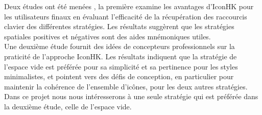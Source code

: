 \documentclass[12pt,a4paper]{article}
\newcommand\tab[1][0.65cm]{\hspace*{#1}}
\begin{document}
\tab Deux études ont été menées \cite{8}, la première examine les avantages d'IconHK pour les utilisateurs finaux en évaluant l'efficacité de la récupération des raccourcis clavier des différentes stratégies. Les résultats suggèrent que les stratégies spatiales positives et négatives sont des aides mnémoniques utiles.\\
\tab Une deuxième étude fournit des idées de concepteurs professionnels sur la praticité de l'approche IconHK. Les résultats indiquent que la stratégie de l'espace vide est préférée pour sa simplicité et sa
pertinence pour les styles minimalistes, et pointent vers des défis de conception, en particulier pour maintenir la cohérence de l'ensemble d'icônes, pour les deux autres stratégies.\\
\tab Dans ce projet nous nous intéresserons à une seule stratégie qui est préférée dans la deuxième étude,
celle de l’espace vide.
\end{document}
